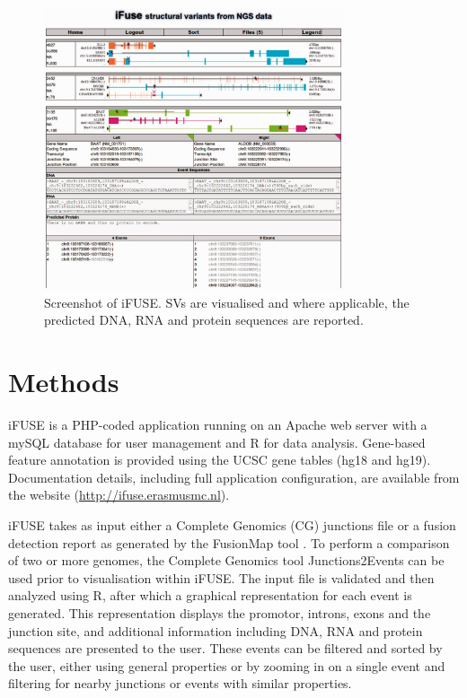 \begin{figure}
\centerline{\includegraphics[width=250pt]{chapters/images/iFUSE/ifusess.jpeg}}
\caption{Screenshot of iFUSE. SVs are visualised and where applicable, the predicted DNA, RNA and protein sequences are reported.}
\label{fig:screenshot}
\end{figure}


\section*{Methods}

iFUSE is a PHP-coded application running on an Apache web server with a mySQL database for user management and R for data analysis. Gene-based feature annotation is provided using the UCSC gene tables (hg18 and hg19). Documentation details, including full application configuration, are available from the website (\href{http://ifuse.erasmusmc.nl}{http://ifuse.erasmusmc.nl}).

iFUSE takes as input either a Complete Genomics (CG) junctions file or a fusion detection report as generated by the FusionMap tool \cite{fusionmap}.  To perform a comparison of two or more genomes, the Complete Genomics tool Junctions2Events can be used prior to visualisation within iFUSE.\color{black}
The input file is validated and then analyzed using R, after which a graphical representation for each event is generated. This representation displays the promotor, introns, exons and the junction site, and additional information including DNA, RNA and protein sequences are presented to the user. These events can be filtered and sorted by the user, either using general properties or by zooming in on a single event and filtering for nearby junctions or events with similar properties.


